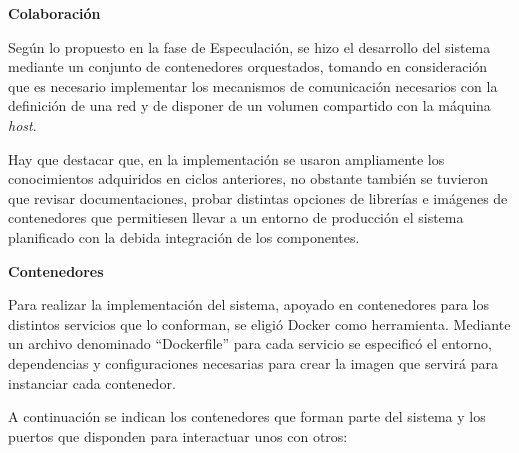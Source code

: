 \documentclass[
  12pt,
  openany]{book}
\begin{document}
\textbf{Colaboración}

Según lo propuesto en la fase de Especulación, se hizo el desarrollo del sistema mediante un conjunto de contenedores orquestados, tomando en consideración que es necesario implementar los mecanismos de comunicación necesarios con la definición de una red y de disponer de un volumen compartido con la máquina \emph{host}.

Hay que destacar que, en la implementación se usaron ampliamente los conocimientos adquiridos en ciclos anteriores, no obstante también se tuvieron que revisar documentaciones, probar distintas opciones de librerías e imágenes de contenedores que permitiesen llevar a un entorno de producción el sistema planificado con la debida integración de los componentes.

\textbf{Contenedores}

Para realizar la implementación del sistema, apoyado en contenedores para los distintos servicios que lo conforman, se eligió Docker como herramienta. Mediante un archivo denominado ``Dockerfile'' para cada servicio se especificó el entorno, dependencias y configuraciones necesarias para crear la imagen que servirá para instanciar cada contenedor.

A continuación se indican los contenedores que forman parte del sistema y los puertos que disponden para interactuar unos con otros:
\end{document}
